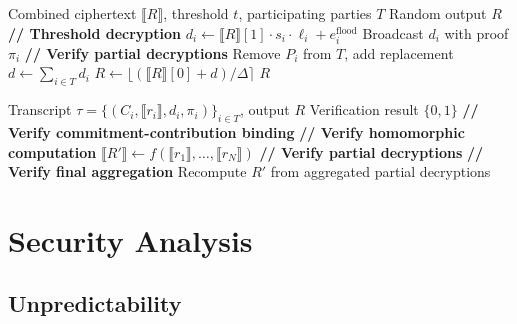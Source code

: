 \documentclass[11pt,a4paper]{article}
\begin{document}
\begin{algorithm}
\caption{ThresholdRNG: Revelation Phase}
\begin{algorithmic}[1]
\Require Combined ciphertext $\llbracket R \rrbracket$, threshold $t$, participating parties $T$
\Ensure Random output $R$
\State \textbf{// Threshold decryption}
    \State $d_i \gets \llbracket R \rrbracket[1] \cdot s_i \cdot \ell_i + e_i^{\text{flood}}$
    \State Broadcast $d_i$ with proof $\pi_i$
\EndFor
\State \textbf{// Verify partial decryptions}
        \State Remove $P_i$ from $T$, add replacement
    \EndIf
\EndFor
\State $d \gets \sum_{i \in T} d_i$
\State $R \gets \lfloor (\llbracket R \rrbracket[0] + d) / \Delta \rceil$
\State \Return $R$
\end{algorithmic}
\end{algorithm}

\begin{algorithm}
\caption{ThresholdRNG: Verification Phase}
\begin{algorithmic}[1]
\Require Transcript $\tau = \{(C_i, \llbracket r_i \rrbracket, d_i, \pi_i)\}_{i \in T}$, output $R$
\Ensure Verification result $\{0, 1\}$
\State \textbf{// Verify commitment-contribution binding}
        \State {}
    \EndIf
\EndFor
\State \textbf{// Verify homomorphic computation}
\State $\llbracket R' \rrbracket \gets f(\llbracket r_1 \rrbracket, \ldots, \llbracket r_N \rrbracket)$
    \State {}
\EndIf
\State \textbf{// Verify partial decryptions}
        \State {}
    \EndIf
\EndFor
\State \textbf{// Verify final aggregation}
\State Recompute $R'$ from aggregated partial decryptions
    \State {}
\EndIf
\State {}
\end{algorithmic}
\end{algorithm}

\section{Security Analysis}

\subsection{Unpredictability}
\end{document}
